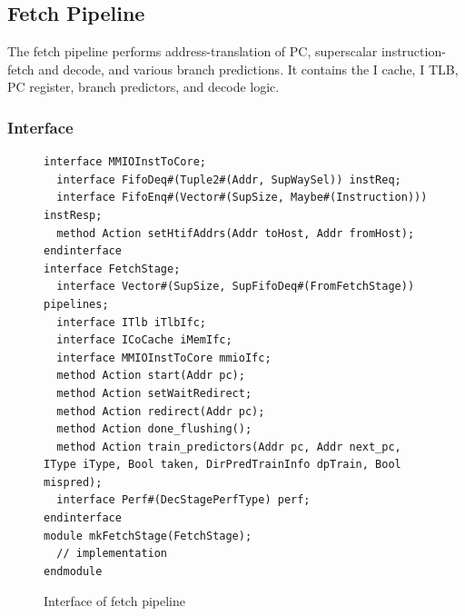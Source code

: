 \subsection{Fetch Pipeline}

The fetch pipeline performs address-translation of PC, superscalar instruction-fetch and decode, and various branch predictions.
It contains the I cache, I TLB, PC register, branch predictors, and decode logic.

\subsubsection{Interface}

\begin{figure}
\begin{lstlisting}[caption={}]
interface MMIOInstToCore;
  interface FifoDeq#(Tuple2#(Addr, SupWaySel)) instReq;
  interface FifoEnq#(Vector#(SupSize, Maybe#(Instruction))) instResp;
  method Action setHtifAddrs(Addr toHost, Addr fromHost);
endinterface
interface FetchStage;
  interface Vector#(SupSize, SupFifoDeq#(FromFetchStage)) pipelines;
  interface ITlb iTlbIfc;
  interface ICoCache iMemIfc;
  interface MMIOInstToCore mmioIfc;
  method Action start(Addr pc);
  method Action setWaitRedirect;
  method Action redirect(Addr pc);
  method Action done_flushing();
  method Action train_predictors(Addr pc, Addr next_pc, IType iType, Bool taken, DirPredTrainInfo dpTrain, Bool mispred);
  interface Perf#(DecStagePerfType) perf;
endinterface
module mkFetchStage(FetchStage);
  // implementation
endmodule
\end{lstlisting}
\caption{Interface of fetch pipeline}\label{fig:fetch-fic}
\end{figure}

